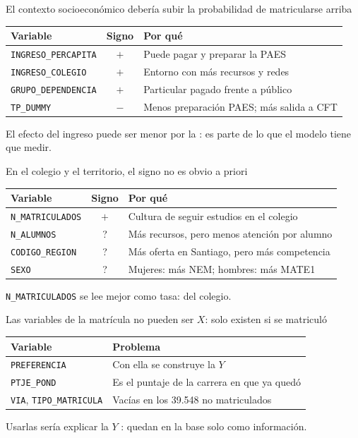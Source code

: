 \begin{frame}{El contexto socioeconómico debería subir la probabilidad de matricularse arriba}
  \begin{center}
  \begin{tabular}{lcl}
    \toprule
    \textbf{Variable} & \textbf{Signo} & \textbf{Por qué} \\
    \midrule
    \texttt{INGRESO\_PERCAPITA} & $+$ & Puede pagar y preparar la PAES \\
    \texttt{INGRESO\_COLEGIO} & $+$ & Entorno con más recursos y redes \\
    \texttt{GRUPO\_DEPENDENCIA} & $+$ & Particular pagado frente a público \\
    \texttt{TP\_DUMMY} & $-$ & Menos preparación PAES; más salida a CFT \\
    \bottomrule
  \end{tabular}
  \end{center}
  \medskip
  El efecto del ingreso puede ser menor por la : es
  parte de lo que el modelo tiene que medir.
\end{frame}

\begin{frame}{En el colegio y el territorio, el signo no es obvio a priori}
  \begin{center}
  \begin{tabular}{lcl}
    \toprule
    \textbf{Variable} & \textbf{Signo} & \textbf{Por qué} \\
    \midrule
    \texttt{N\_MATRICULADOS} & $+$ & Cultura de seguir estudios en el colegio \\
    \texttt{N\_ALUMNOS} & ? & Más recursos, pero menos atención por alumno \\
    \texttt{CODIGO\_REGION} & ? & Más oferta en Santiago, pero más competencia \\
    \texttt{SEXO} & ? & Mujeres: más NEM; hombres: más MATE1 \\
    \bottomrule
  \end{tabular}
  \end{center}
  \medskip
  \texttt{N\_MATRICULADOS} se lee mejor como tasa:  del colegio.
\end{frame}

\begin{frame}{Las variables de la matrícula no pueden ser $X$: solo existen si se matriculó}
  \begin{center}
  \begin{tabular}{ll}
    \toprule
    \textbf{Variable} & \textbf{Problema} \\
    \midrule
    \texttt{PREFERENCIA} & Con ella se construye la $Y$ \\
    \texttt{PTJE\_POND} & Es el puntaje de la carrera en que ya quedó \\
    \texttt{VIA}, \texttt{TIPO\_MATRICULA} & Vacías en los 39.548 no matriculados \\
    \bottomrule
  \end{tabular}
  \end{center}
  \medskip
  Usarlas sería explicar la $Y$ : quedan en la
  base solo como información.
\end{frame}

